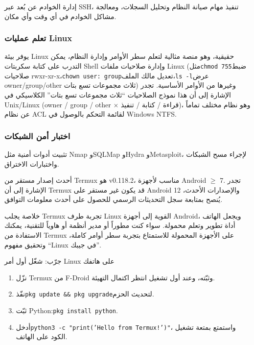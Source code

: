 إدارة الخوادم عن بُعد عبر SSH، تنفيذ مهام صيانة النظام وتحليل السجلات، ومعالجة مشاكل الخوادم في أي وقت وأي مكان.

\subsubsection*{تعلم عمليات Linux}

يوفر بيئة Linux حقيقية، وهو منصة مثالية لتعلم سطر الأوامر وإدارة النظام، يمكن التدرب على كتابة سكربتات Shell وإدارة صلاحيات ملفات Linux (مثل\texttt{chmod 755}ضبط صلاحيات rwxr-xr-x،\texttt{chown user: group}تعديل مالك الملف،\texttt{ls -\allowbreak l}عرض owner/group/other ثلاث مجموعات تسع بتات) وغيرها من الأوامر الأساسية. تجدر الإشارة إلى أن هذا نموذج الصلاحيات “ثلاث مجموعات تسع بتات” الكلاسيكي في Unix/Linux (owner / group / other × قراءة / كتابة / تنفيذ)، وهو نظام مختلف تماماً عن نظام ACL لقائمة التحكم بالوصول في Windows NTFS.

\subsubsection*{اختبار أمن الشبكات}

تثبيت أدوات أمنية مثل Nmap وSQLMap وHydra وMetasploit، لإجراء مسح الشبكات واختبارات الاختراق.


أحدث إصدار مستقر من Termux هو v0.118.2، مناسب لأجهزة Android $\geq$ 7. تجدر الإشارة إلى أن Termux قد يكون غير مستقر على Android 12 والإصدارات الأحدث، يُنصح بمتابعة سجل التحديثات الرسمي للحصول على أحدث معلومات التوافق.

\begin{tcbinfo}{خلاصة}
يجلب Termux تجربة طرف Linux القوية إلى أجهزة Android، ويجعل الهاتف أداة تطوير وتعلم محمولة. سواء كنت مطوراً أو مدير أنظمة أو هاوياً للتقنية، يمكنك الاستفادة من Termux على الأجهزة المحمولة للاستمتاع بتجربة سطر أوامر كاملة، وتحقيق مفهوم “Linux في جيبك”.

\end{tcbinfo}

\begin{tcbpractice}{جرّب: شغّل أول أمر Linux على هاتفك}
\begin{enumerate}
  \item نزّل Termux من F-Droid وثبّته، وعند أول تشغيل انتظر اكتمال التهيئة.
  \item نفّذ\texttt{pkg update \&\& pkg upgrade}لتحديث الحزم.
  \item ثبّت Python:\texttt{pkg install python}.
  \item أدخل\texttt{python3 -\allowbreak c "print('Hello from Termux!')"}، واستمتع بمتعة تشغيل الكود على الهاتف.
\end{enumerate}

\end{tcbpractice}
